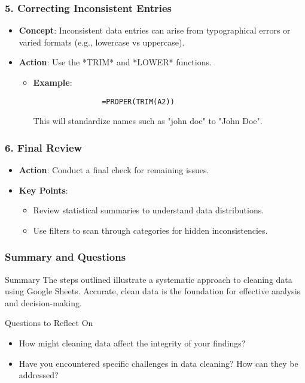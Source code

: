 \documentclass[aspectratio=169]{beamer}
\begin{document}
\begin{frame}[fragile]
    \frametitle{5. Correcting Inconsistent Entries}
    \begin{itemize}
        \item \textbf{Concept}: Inconsistent data entries can arise from typographical errors or varied formats (e.g., lowercase vs uppercase).
        \item \textbf{Action}: Use the *TRIM* and *LOWER* functions.
            \begin{itemize}
                \item \textbf{Example}:
                \begin{lstlisting}
                =PROPER(TRIM(A2))
                \end{lstlisting}
                This will standardize names such as "john doe" to "John Doe".
            \end{itemize}
    \end{itemize}
\end{frame}

\begin{frame}[fragile]
    \frametitle{6. Final Review}
    \begin{itemize}
        \item \textbf{Action}: Conduct a final check for remaining issues.
        \item \textbf{Key Points}:
            \begin{itemize}
                \item Review statistical summaries to understand data distributions.
                \item Use filters to scan through categories for hidden inconsistencies.
            \end{itemize}
    \end{itemize}
\end{frame}

\begin{frame}[fragile]
    \frametitle{Summary and Questions}
    \begin{block}{Summary}
        The steps outlined illustrate a systematic approach to cleaning data using Google Sheets. Accurate, clean data is the foundation for effective analysis and decision-making.
    \end{block}
    \begin{block}{Questions to Reflect On}
        \begin{itemize}
            \item How might cleaning data affect the integrity of your findings?
            \item Have you encountered specific challenges in data cleaning? How can they be addressed?
        \end{itemize}
    \end{block}
\end{frame}
\end{document}
